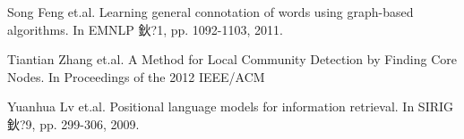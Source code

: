 \documentclass[runningheads]{llncs}
\begin{document}
\begin{thebibliography}{8}
Song Feng et.al.
\newblock Learning general connotation of words using graph-based algorithms.
\newblock In EMNLP 鈥?1, pp. 1092-1103, 2011.

Tiantian Zhang et.al.
\newblock A Method for Local Community Detection by Finding Core Nodes. 
\newblock In Proceedings of the 2012 IEEE/ACM 

Yuanhua Lv et.al.
\newblock Positional language models for information retrieval.
\newblock In SIRIG 鈥?9, pp. 299-306, 2009.


\end{thebibliography}
\end{document}
